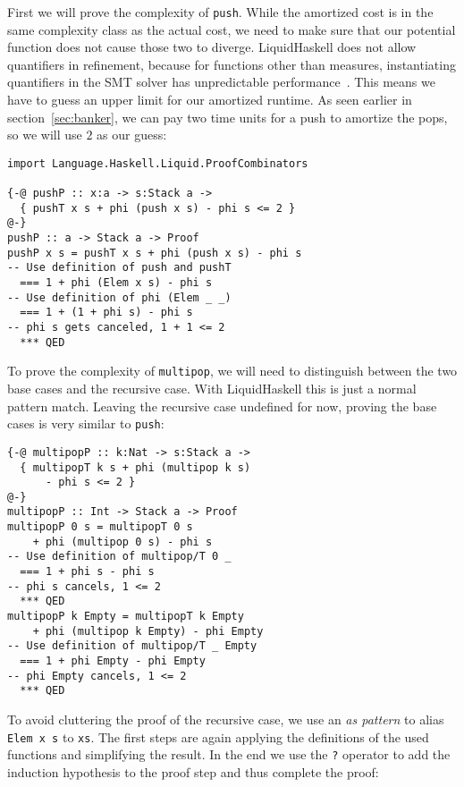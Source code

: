 \documentclass[sigplan,screen,review,anonymous]{acmart}
\begin{document}
First we will prove the complexity of \texttt{push}. While the amortized cost is in the same complexity class as the actual cost, we need to make sure that our potential function does not cause those two to diverge. LiquidHaskell does not allow quantifiers in refinement, because for functions other than measures, instantiating quantifiers in the SMT solver has unpredictable performance~\cite{lh_quantifiers}. This means we have to guess an upper limit for our amortized runtime. As seen earlier in section~\ref{sec:banker}, we can pay two time units for a push to amortize the pops, so we will use $2$ as our guess:

\begin{lstlisting}
import Language.Haskell.Liquid.ProofCombinators

{-@ pushP :: x:a -> s:Stack a ->
  { pushT x s + phi (push x s) - phi s <= 2 }
@-}
pushP :: a -> Stack a -> Proof
pushP x s = pushT x s + phi (push x s) - phi s
-- Use definition of push and pushT
  === 1 + phi (Elem x s) - phi s
-- Use definition of phi (Elem _ _)
  === 1 + (1 + phi s) - phi s
-- phi s gets canceled, 1 + 1 <= 2
  *** QED
\end{lstlisting}

To prove the complexity of \texttt{multipop}, we will need to distinguish between the two base cases and the recursive case. With LiquidHaskell this is just a normal pattern match. Leaving the recursive case undefined for now, proving the base cases is very similar to \texttt{push}:

\begin{lstlisting}
{-@ multipopP :: k:Nat -> s:Stack a ->
  { multipopT k s + phi (multipop k s)
      - phi s <= 2 }
@-}
multipopP :: Int -> Stack a -> Proof
multipopP 0 s = multipopT 0 s
    + phi (multipop 0 s) - phi s
-- Use definition of multipop/T 0 _
  === 1 + phi s - phi s
-- phi s cancels, 1 <= 2
  *** QED
multipopP k Empty = multipopT k Empty
    + phi (multipop k Empty) - phi Empty
-- Use definition of multipop/T _ Empty
  === 1 + phi Empty - phi Empty
-- phi Empty cancels, 1 <= 2
  *** QED
\end{lstlisting}

To avoid cluttering the proof of the recursive case, we use an \textit{as pattern} to alias \texttt{Elem x s} to \texttt{xs}. The first steps are again applying the definitions of the used functions and simplifying the result. In the end we use the \texttt{?} operator to add the induction hypothesis to the proof step and thus complete the proof:
\end{document}
